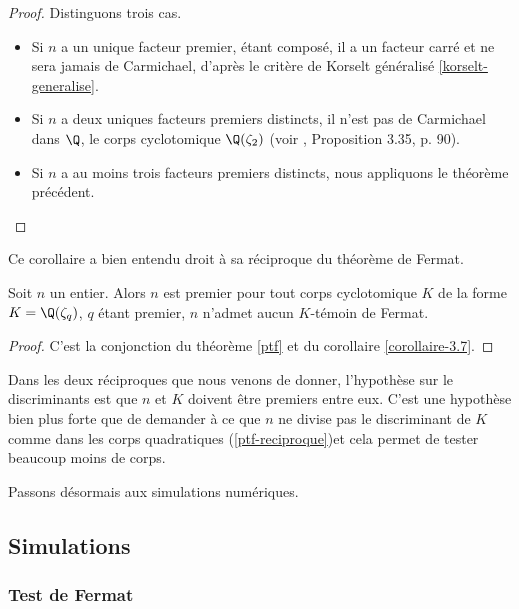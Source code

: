 \begin{proof}
	Distinguons trois cas.
	\begin{itemize}
		\item Si $n$ a un unique facteur premier, étant composé, il a un facteur carré et ne sera jamais de Carmichael, d'après le critère de Korselt généralisé \ref{korselt-generalise}.
		\item Si $n$ a deux uniques facteurs premiers distincts, il n'est pas de Carmichael dans $\Q$, le corps cyclotomique $\Q(\zeta_2)$ (voir \cite{Demazure}, Proposition 3.35, p. 90).
		\item Si $n$ a au moins trois facteurs premiers distincts, nous appliquons le théorème précédent.
	\end{itemize}
\end{proof}

Ce corollaire a bien entendu droit à sa réciproque du théorème de Fermat.

\begin{theoreme}
	Soit $n$ un entier. Alors $n$ est premier \ssi pour tout corps cyclotomique $K$ de la forme $K = \Q(\zeta_q)$, $q$ étant premier, $n$ n'admet aucun $K$-témoin de Fermat.
\end{theoreme}

\begin{proof}
	C'est la conjonction du théorème \ref{ptf} et du corollaire \ref{corollaire-3.7}.
\end{proof}

\begin{remarque}
	Dans les deux réciproques que nous venons de donner, l'hypothèse sur le discriminants est que $n$ et $K$ doivent être premiers entre eux. C'est une hypothèse bien plus forte que de demander à ce que $n$ ne divise pas le discriminant de $K$ comme dans les corps quadratiques (\ref{ptf-reciproque})et cela permet de tester beaucoup moins de corps.
\end{remarque}

Passons désormais aux simulations numériques.

\subsection{Simulations}

\subsubsection{Test de Fermat}

